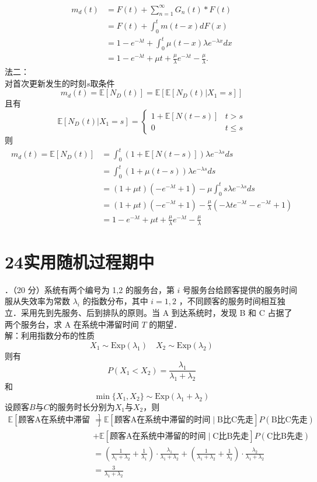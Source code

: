 \documentclass[UTF8,openany]{book}
\begin{document}
\begin{align*}
	m_d(t)&=F(t)+\sum_{n=1}^{\infty}G_n(t)*F(t)\\
	&=F(t)+\int_0^t m(t - x) dF(x)\\
	&=1-e^{-\lambda t}+\int_0^t \mu (t - x) \lambda e^{-\lambda x}dx\\
	&=1-e^{-\lambda t}+\mu t+\frac{\mu}{\lambda}e^{-\lambda t}-\frac{\mu}{\lambda}.
\end{align*}
法二：\\
对首次更新发生的时刻$s$取条件
$$
m_d(t)=\mathbb{E}[N_D(t)]=\mathbb{E}\left[\mathbb{E}[N_D(t)|X_1=s] \right] 
$$
且有
$$
\mathbb{E}[N_D(t)|X_1=s]=
\begin{cases}
	1+\mathbb{E}[N(t-s)]  &  t>s \\
	0  &  t\le s
\end{cases}
$$
则
$$
\begin{aligned}
	m_d(t)=\mathbb{E}[N_D(t)]&=\int_{0}^{t} \left(1+\mathbb{E}[N(t-s)] \right) \lambda e^{-\lambda s}ds\\
	&=\int_{0}^{t} \left(1+\mu(t-s) \right) \lambda e^{-\lambda s}ds\\
	&=(1+\mu t)\left(-e^{-\lambda t}+1 \right) -\mu \int_{0}^{t} s\lambda e^{-\lambda s}ds \\
	&=(1+\mu t)\left(-e^{-\lambda t}+1 \right) -\frac{\mu}{\lambda}\left( -\lambda t e^{-\lambda t} -e^{-\lambda t}+1\right)\\
	&=1-e^{-\lambda t}+\mu t+\frac{\mu}{\lambda}e^{-\lambda t}-\frac{\mu}{\lambda}
\end{aligned}
$$
\newpage
\section{\centering 24实用随机过程期中}
．（20 分）系统有两个编号为 1,2 的服务台，第 $i$ 号服务台给顾客提供的服务时间服从失效率为常数 $\lambda_{i}$ 的指数分布，其中 $i=1,2$ ，不同顾客的服务时间相互独立．采用先到先服务、后到排队的原则。当 A 到达系统时，发现 B 和 C 占据了两个服务台，求 A 在系统中滞留时间 $T$ 的期望．\\
解：利用指数分布的性质
\[
X_1\sim \mathrm{Exp}(\lambda_1) \quad X_2\sim \mathrm{Exp}(\lambda_2) 
\]
则有
\[
P(X_1<X_2)=\frac{\lambda_1}{\lambda_1+\lambda_2}
\]
和
\[
\min\{X_1,X_2\} \sim \mathrm{Exp}(\lambda_1+\lambda_2)
\]
设顾客$B$与$C$的服务时长分别为$X_1$与$X_2$，则
\begin{align*}
	\mathbb{E}\left[\text{顾客A在系统中滞留的时间} \right]  &= \mathbb{E}\left[\text{顾客A在系统中滞留的时间}\mid \text{B比C先走} \right]P(\text{B比C先走})\\
	&+\mathbb{E}\left[\text{顾客A在系统中滞留的时间}\mid \text{C比B先走} \right]P(\text{C比B先走}) \\
	& = \left(\frac{1}{\lambda_1+\lambda_2}+\frac{1}{\lambda_1} \right)\cdot \frac{\lambda_1}{\lambda_1+\lambda_2}+ \left(\frac{1}{\lambda_1+\lambda_2}+\frac{1}{\lambda_2} \right)\cdot \frac{\lambda_2}{\lambda_1+\lambda_2}\\
	&=\frac{3}{\lambda_1+\lambda_2}
\end{align*}\\
\end{document}
